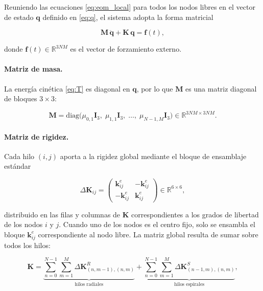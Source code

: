 \documentclass[11pt,letterpaper]{article}
\begin{document}
Reuniendo las ecuaciones \eqref{eq:eom_local} para todos los nodos libres
en el vector de estado $\mathbf{q}$ definido en \eqref{eq:q}, el sistema
adopta la forma matricial

\begin{equation}\label{eq:sistema}
    \mathbf{M}\,\ddot{\mathbf{q}} + \mathbf{K}\,\mathbf{q} = \mathbf{f}(t),
\end{equation}

donde $\mathbf{f}(t) \in \mathbb{R}^{3NM}$ es el vector de forzamiento
externo.

\paragraph{Matriz de masa.}
La energía cinética \eqref{eq:T} es diagonal en $\mathbf{q}$, por lo que
$\mathbf{M}$ es una matriz diagonal de bloques $3\times 3$:

\begin{equation}\label{eq:M}
    \mathbf{M}
    =
    \mathrm{diag}\!\bigl(
        \mu_{0,1}\mathbf{I}_3,\;
        \mu_{1,1}\mathbf{I}_3,\;
        \dots,\;
        \mu_{N-1,M}\mathbf{I}_3
    \bigr)
    \in \mathbb{R}^{3NM\times 3NM}.
\end{equation}

\paragraph{Matriz de rigidez.}
Cada hilo $(i,j)$ aporta a la rigidez global mediante el bloque de
ensamblaje estándar \cite{meirovitch2001,jayaraman1981}

\begin{equation}\label{eq:ensamble}
    \Delta\mathbf{K}_{ij}
    =
    \begin{pmatrix}
         \mathbf{k}^e_{ij} & -\mathbf{k}^e_{ij} \\
        -\mathbf{k}^e_{ij} &  \mathbf{k}^e_{ij}
    \end{pmatrix}
    \in \mathbb{R}^{6\times 6},
\end{equation}

distribuido en las filas y columnas de $\mathbf{K}$ correspondientes a
los grados de libertad de los nodos $i$ y $j$. Cuando uno de los nodos
es el centro fijo, solo se ensambla el bloque $\mathbf{k}^e_{ij}$
correspondiente al nodo libre. La matriz global resulta de sumar sobre
todos los hilos:

\begin{equation}\label{eq:K}
    \mathbf{K}
    =
    \underbrace{
        \sum_{n=0}^{N-1}\sum_{m=1}^{M}
        \Delta\mathbf{K}^{R}_{(n,m-1),(n,m)}
    }_{\text{hilos radiales}}
    +
    \underbrace{
        \sum_{n=0}^{N-1}\sum_{m=1}^{M}
        \Delta\mathbf{K}^{S}_{(n-1,m),(n,m)}
    }_{\text{hilos espirales}},
\end{equation}
\end{document}
